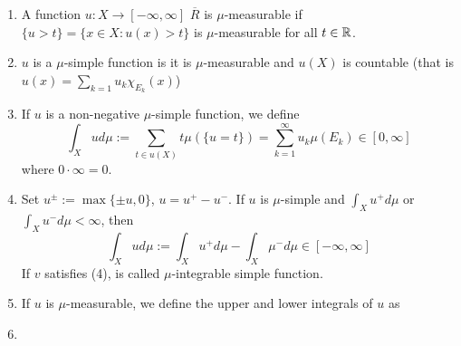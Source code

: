 \begin{definition}
\begin{enumerate}[(1]
\item A function $u : X \to [-\infty,\infty]$ $\overline{R}$ is $\mu$-measurable if
$\{u > t\} = \{ x \in X : u(x) > t\}$ is $\mu$-measurable for all $t\in \mathbb{R}$.
\item $u$ is a $\mu$-simple function is it is $\mu$-measurable and $u(X)$ is
countable (that is $u(x) = \sum_{k=1} u_k \chi_{E_k}(x)$)
\item If $u$ is a non-negative $\mu$-simple function, we define 
\[
\int_X u d\mu := \sum_{t \in u(X)} t\mu(\{u=t\}) = \sum_{k=1}^\infty u_k
\mu(E_k) \in [0,\infty]
\]
where $0 \cdot \infty = 0$.
\item Set $u^\pm := \max\{\pm u, 0 \}$, $u = u^+ - u^-$. 
If $u$ is $\mu$-simple and $\int_X u^+ d\mu$ or $\int_X u^- d\mu < \infty$, then
\[
\int_X u d\mu := \int_X u^+ d\mu - \int_X \mu^- d\mu \in [-\infty,\infty]
\]
If $v$ satisfies (4), is called $\mu$-integrable simple function.
\item If $u$ is $\mu$-measurable, we define the upper and lower integrals of $u$
as
\item \TODO
\end{enumerate}
\TODO
\end{definition}
